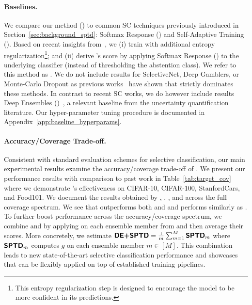 \paragraph{Baselines.} We compare our method (\sptd) to common SC techniques previously introduced in Section~\ref{sec:background_sptd}: Softmax Response (\sr) and Self-Adaptive Training (\sat). Based on recent insights from~\cite{feng2023towards}, we (i) train \sat with additional entropy regularization\footnote{This entropy regularization step is designed to encourage the model to be more confident in its predictions.}; and (ii) derive \sat's score by applying Softmax Response (\sr) to the underlying classifier (instead of thresholding the abstention class). We refer to this method as \satersr. We do not include results for SelectiveNet, Deep Gamblers, or Monte-Carlo Dropout as previous works~\citep{huang2020self,feng2023towards} have shown that \fixed{\satersr} strictly dominates these methods. In contrast to recent SC works, we do however include results  Deep Ensembles (\de)~\citep{balaji2017uncertainty}, a relevant baseline from the uncertainty quantification literature. Our hyper-parameter tuning procedure is documented in Appendix~\ref{app:baseline_hyperparams}.



\paragraph{Accuracy/Coverage Trade-off.} Consistent with standard evaluation schemes for selective classification, our main experimental results examine the accuracy/coverage trade-off of \sptd. We present our performance results with comparison to past work in Table~\ref{tab:target_cov} where we demonstrate \sptd's effectiveness on CIFAR-10, CIFAR-100, StanfordCars, and Food101. We document the results obtained by \sptd, \sat, \sr, and \de across the full coverage spectrum. 
We see that \sptd outperforms both \sat and \sr and performs similarly as \de. To further boost performance across the accuracy/coverage spectrum, we combine \sptd and \de by applying \sptd on each ensemble member from \de and then average their scores. More concretely, we estimate $\textbf{\sffamily DE+SPTD} = \frac{1}{m}\sum_{m=1}^M \textbf{\sffamily SPTD}_m$ where $\textbf{\sffamily SPTD}_m$ computes $g$ on each ensemble member $m\in[M]$. This combination leads to new state-of-the-art selective classification performance and showcases that \sptd can be flexibly applied on top of established training pipelines. 

